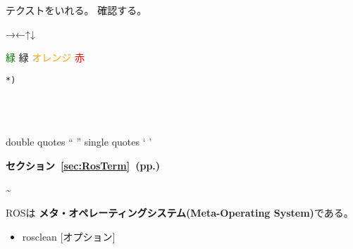 \setcounter{num}{0}

\vspace{\baselineskip}
\noindent
{}
\thenum


\setcounter{num}{0}
\vspace{\baselineskip}
\noindent
{}\circled{\thenum} テクストをいれる。
\circled{\thenum} 確認する。


→←↑↓

\textcolor{green}{緑}
{\color{limegreen}緑}
\textcolor{orange}{オレンジ}
\textcolor{red}{赤}


\vspace{\baselineskip}
\begin{lstlisting}[language=ROS]
%*
*)
\end{lstlisting}

\begin{lstlisting}[language=C++]
\end{lstlisting}
\begin{lstlisting}[language=bash]
\end{lstlisting}
\begin{lstlisting}[language=XML]
\end{lstlisting}
\begin{lstlisting}[language=make]
\end{lstlisting}


double quotes
`` ''
single quotes
` '

\begin{exercise}[ROSシェルコマンドを使用できる環境]
\end{exercise}

\setcounter{num}{0}

\circled{\thenum}

\cite{book_key}

\textbf{セクション~\ref{sec:RosTerm}~(pp.\pageref{sec:RosTerm})}

\textasciitilde

\begin{center}
ROSは \textbf{メタ・オペレーティングシステム(Meta-Operating System)}である。
\end{center}

\begin{itemize}
\item  rosclean [オプション]
\end{itemize}

\vspace{\baselineskip}
\noindent
\begin{description}
\item[]
\end{description}

